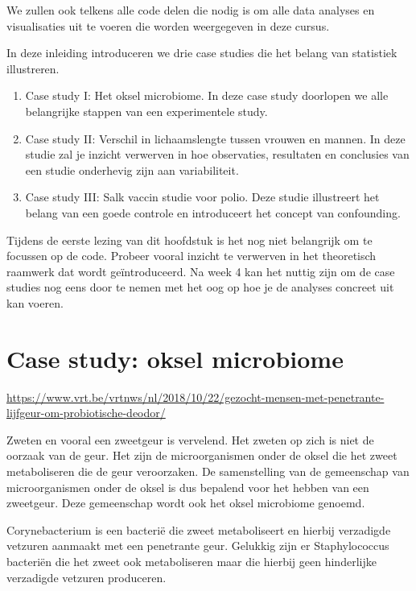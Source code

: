 \documentclass[
  12pt,dutch,coursenotes]{book}
\theoremstyle{definition}
\theoremstyle{definition}
\theoremstyle{definition}
\theoremstyle{remark}
\begin{document}
We zullen ook telkens alle code delen die nodig is om alle data analyses en visualisaties uit te voeren die worden weergegeven in deze cursus.

In deze inleiding introduceren we drie case studies die het belang van statistiek illustreren.

\begin{enumerate}
\def\labelenumi{\arabic{enumi}.}
\item
  Case study I: Het oksel microbiome. In deze case study doorlopen we alle belangrijke stappen van een experimentele study.
\item
  Case study II: Verschil in lichaamslengte tussen vrouwen en mannen. In deze studie zal je inzicht verwerven in hoe observaties, resultaten en conclusies van een studie onderhevig zijn aan variabiliteit.
\item
  Case study III: Salk vaccin studie voor polio. Deze studie illustreert het belang van een goede controle en introduceert het concept van confounding.
\end{enumerate}

Tijdens de eerste lezing van dit hoofdstuk is het nog niet belangrijk om te focussen op de code. Probeer vooral inzicht te verwerven in het theoretisch raamwerk dat wordt geïntroduceerd. Na week 4 kan het nuttig zijn om de case studies nog eens door te nemen met het oog op hoe je de analyses concreet uit kan voeren.

\hypertarget{case-study-oksel-microbiome}{%
\section{Case study: oksel microbiome}\label{case-study-oksel-microbiome}}

\url{https://www.vrt.be/vrtnws/nl/2018/10/22/gezocht-mensen-met-penetrante-lijfgeur-om-probiotische-deodor/}

Zweten en vooral een zweetgeur is vervelend.
Het zweten op zich is niet de oorzaak van de geur.
Het zijn de microorganismen onder de oksel die het zweet metaboliseren die de geur veroorzaken.
De samenstelling van de gemeenschap van microorganismen onder de oksel is dus bepalend voor het hebben van een zweetgeur.
Deze gemeenschap wordt ook het oksel microbiome genoemd.

Corynebacterium is een bacterië die zweet metaboliseert en hierbij verzadigde vetzuren aanmaakt met een penetrante geur.
Gelukkig zijn er Staphylococcus bacteriën die het zweet ook metaboliseren maar die hierbij geen hinderlijke verzadigde vetzuren produceren.
\end{document}
